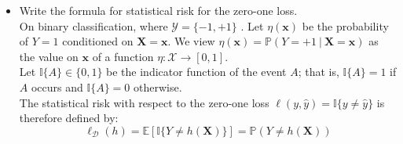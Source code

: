 \begin{itemize}
    \item Write the formula for statistical risk for the zero-one loss.\\

        On binary classification, where $\mathcal{Y} = \{-1, +1\}$ . Let $\eta(\boldsymbol{x})$ be the probability of $Y = 1$ conditioned on $\textbf{X} = \boldsymbol{x}$. We view $\eta(\boldsymbol{x}) = \mathbb{P}(Y = +1\ |\ \textbf{X} = \boldsymbol{x})$ as the value on $\boldsymbol{x}$ of a function $\eta : \mathcal{X} \rightarrow [0,1]$.\\
        Let $\mathbb{I}\{A\} \in \{0,1\}$ be the indicator function of the event $A$; that is, $\mathbb{I}\{A\} = 1$ if $A$ occurs and $\mathbb{I}\{A\} = 0$ otherwise.\\
        The statistical risk with respect to the zero-one loss $\ell(y, \hat{y}) = \mathbb{I}\{y \neq \hat{y}\}$ is therefore defined by:
        $$
        \ell_{\mathcal{D}}(h) = \mathbb{E}[\mathbb{I}\{Y \neq h(\boldsymbol{X})\}] = \mathbb{P}(Y \neq h(\boldsymbol{X}))
        $$
\end{itemize}
